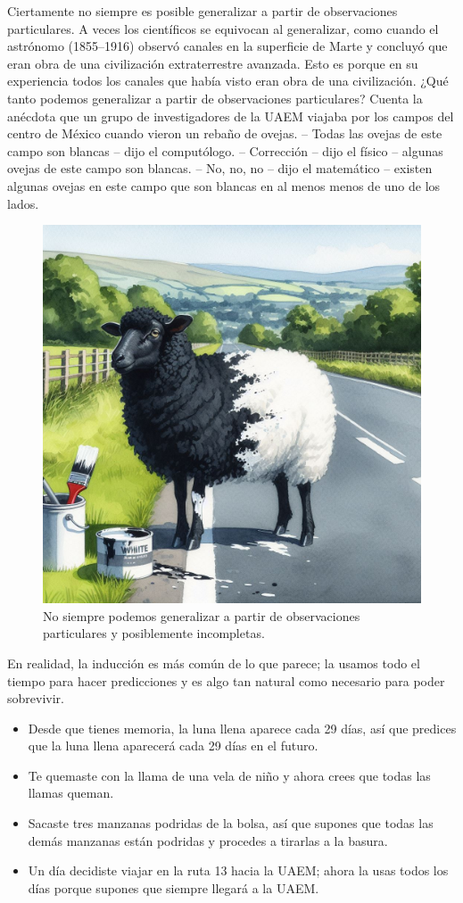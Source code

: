 Ciertamente no siempre es posible generalizar a partir de observaciones
particulares.
A veces los científicos se equivocan al generalizar, como cuando el astrónomo
 (1855--1916) observó canales en la
superficie de Marte y concluyó que eran obra de una civilización extraterrestre
avanzada.
Esto es porque en su experiencia todos los canales que había visto eran obra de
una civilización.
¿Qué tanto podemos generalizar a partir de observaciones particulares?
Cuenta la anécdota que un grupo de investigadores de la UAEM viajaba por los
campos del centro de México cuando vieron un rebaño de ovejas.
-- Todas las ovejas de este campo son blancas -- dijo el computólogo.
-- Corrección -- dijo el físico -- algunas ovejas de este campo son blancas.
-- No, no, no -- dijo el matemático -- existen algunas ovejas en este campo que
son blancas en al menos menos de uno de los lados.

\begin{figure}[ht]
    \centering
    \includegraphics[width=0.8\linewidth]{img/oveja}
    \caption{No siempre podemos generalizar a partir de observaciones
        particulares y posiblemente incompletas.}
\end{figure}

En realidad, la inducción es más común de lo que parece; la usamos todo el
tiempo para hacer predicciones y es algo tan natural como necesario para poder
sobrevivir.
\begin{itemize}
    \item Desde que tienes memoria, la luna llena aparece cada 29 días, así que
          predices que la luna llena aparecerá cada 29 días en el futuro.
    \item Te quemaste con la llama de una vela de niño y ahora crees que todas
          las llamas queman.
    \item Sacaste tres manzanas podridas de la bolsa, así que supones que todas
          las demás manzanas están podridas y procedes a tirarlas a la basura.
    \item Un día decidiste viajar en la ruta 13 hacia la UAEM; ahora la usas
          todos los días porque supones que siempre llegará a la UAEM.
\end{itemize}

